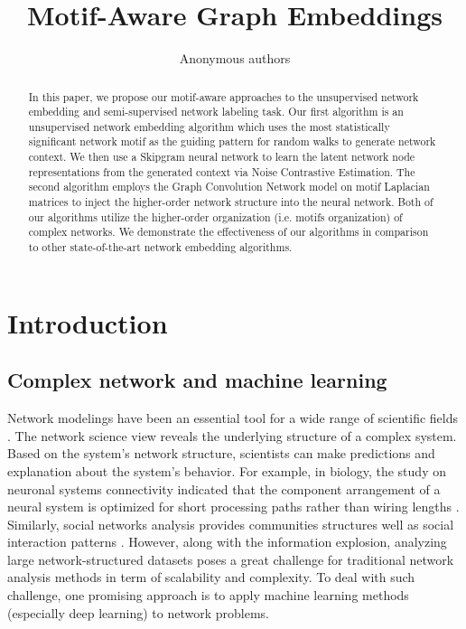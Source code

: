 \documentclass{article}
\title{Motif-Aware Graph Embeddings}
\author{Anonymous authors}
\theoremstyle{definition}
\begin{document}
\maketitle

\begin{abstract}

  In this paper, we propose our motif-aware approaches to the 
  unsupervised network embedding and semi-supervised network labeling 
  task. Our first algorithm is an unsupervised network embedding 
  algorithm which uses the most statistically significant network motif 
  as the guiding pattern for random walks to generate network context. We 
  then use a Skipgram neural network to learn the latent network node 
  representations from the generated context via Noise Contrastive 
  Estimation. The second algorithm employs the Graph Convolution Network 
  model on motif Laplacian matrices to inject the higher-order network 
  structure into the neural network. Both of our algorithms utilize the 
  higher-order organization (i.e. motifs organization) of complex 
  networks. We demonstrate the effectiveness of our algorithms in 
  comparison to other state-of-the-art network embedding algorithms.

\end{abstract}

\section{Introduction}

\subsection{Complex network and machine learning}

Network modelings have been an essential tool for a wide
range of scientific fields
\cite{physicnet,molecule,youtube,motifblockmilo,juremotif}.
The network science view reveals the underlying structure 
of a complex system. Based on the system's network structure, 
scientists can make predictions and explanation
about the system's behavior. For example, in biology, the
study on neuronal systems connectivity indicated
that the component arrangement of a neural system is optimized
for short processing paths rather than wiring lengths
\cite{kaiser2006nonoptimal}. Similarly, social networks 
analysis provides communities structures well as 
social interaction patterns 
\cite{west2014exploiting,barabasi2014network}. 
However, along with the information explosion, analyzing
large network-structured datasets poses a great challenge 
for traditional network analysis methods in term of 
scalability and complexity. To deal with such challenge,
one promising approach is to apply machine learning methods 
(especially deep learning) to network problems.
\end{document}
